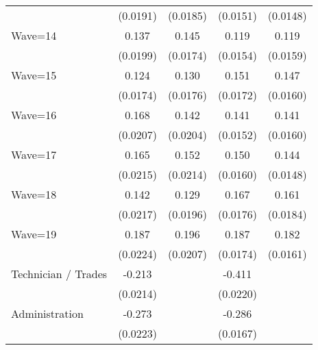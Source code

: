 {\begin{tabular}{l*{4}{c}}
                    &    (0.0191)         &    (0.0185)         &    (0.0151)         &    (0.0148)         \\
[1em]
Wave=14             &       0.137\sym{***}&       0.145\sym{***}&       0.119\sym{***}&       0.119\sym{***}\\
                    &    (0.0199)         &    (0.0174)         &    (0.0154)         &    (0.0159)         \\
[1em]
Wave=15             &       0.124\sym{***}&       0.130\sym{***}&       0.151\sym{***}&       0.147\sym{***}\\
                    &    (0.0174)         &    (0.0176)         &    (0.0172)         &    (0.0160)         \\
[1em]
Wave=16             &       0.168\sym{***}&       0.142\sym{***}&       0.141\sym{***}&       0.141\sym{***}\\
                    &    (0.0207)         &    (0.0204)         &    (0.0152)         &    (0.0160)         \\
[1em]
Wave=17             &       0.165\sym{***}&       0.152\sym{***}&       0.150\sym{***}&       0.144\sym{***}\\
                    &    (0.0215)         &    (0.0214)         &    (0.0160)         &    (0.0148)         \\
[1em]
Wave=18             &       0.142\sym{***}&       0.129\sym{***}&       0.167\sym{***}&       0.161\sym{***}\\
                    &    (0.0217)         &    (0.0196)         &    (0.0176)         &    (0.0184)         \\
[1em]
Wave=19             &       0.187\sym{***}&       0.196\sym{***}&       0.187\sym{***}&       0.182\sym{***}\\
                    &    (0.0224)         &    (0.0207)         &    (0.0174)         &    (0.0161)         \\
[1em]
Technician / Trades &      -0.213\sym{***}&                     &      -0.411\sym{***}&                     \\
                    &    (0.0214)         &                     &    (0.0220)         &                     \\
[1em]
Administration      &      -0.273\sym{***}&                     &      -0.286\sym{***}&                     \\
                    &    (0.0223)         &                     &    (0.0167)         &                     \\

\end{tabular}}
